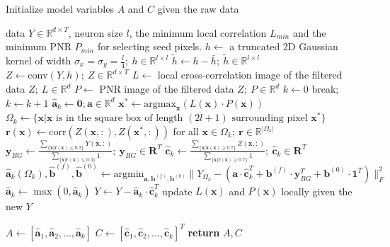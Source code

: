 \documentclass[9pt,lineno]{elife}
\begin{document}
\begin{algorithm}[t!]\small 
\caption{Initialize model variables $A$ and $C$ given the raw data}\label{algo:init}
\begin{algorithmic}[1]
\Require data $Y\in \mathbb{R}^{d\times T}$, neuron size $l$, the minimum local correlation $L_{min}$ and the minimum PNR  $P_{min}$ for selecting seed pixels. 
\State $h \leftarrow $ a truncated 2D Gaussian kernel of width $\sigma_x=\sigma_y=\frac{l}{4}; ~h\in \mathbb{R}^{l\times l}$ 
\State $\tilde{h} \leftarrow h - \bar{h}; ~\tilde{h}\in \mathbb{R}^{l\times l}$  
\State $Z \leftarrow \text{conv}(Y, h); ~ Z \in \mathbb{R}^{d\times T}$ 
\State $L \leftarrow $ local cross-correlation  image of the filtered data $Z; ~L\in \mathbb{R}^{d}$
\State $P \leftarrow $  PNR image of the filtered data $Z; ~P\in\mathbb{R}^{d}$
\State $k\leftarrow 0$ 
  \State break;
  \Else
  \State $k\leftarrow k+1$
    \State $\hat{\bm{a}}_k\leftarrow \bm{0}; \bm{a} \in\mathbb{R}^d$
  \State $\bm{x}^* \leftarrow \text{argmax}_{\bm{x}}(L(\bm{x})\cdot P(\bm{x}))$ 
  \State $\Omega_k \leftarrow \{\bm{x}|\bm{x} \text{ is in the square box of length }( 2 l+1) \text{ surrounding pixel } \bm{x}^*\}$ 
  \State $\bm{r}(\bm{x})\leftarrow \text{corr}(Z(\bm{x},:), Z(\bm{x}^*,:))$ for all $\bm{x}\in\Omega_k; ~ \bm{r}\in \mathbb{R}^{|\Omega_k|}$  
  \State $\bm{y}_{BG} \leftarrow \frac{\sum_{\{\bm{x}|\bm{r}(\bm{x})\leq 0.3\}}Y(\bm{x}, :)}{\sum_{\{\bm{x}|\bm{r}(\bm{x})\leq 0.3\}}1}; ~\bm{y}_{BG}\in\mathbf{R}^{T}$  
  \State $\hat{\bm{c}}_k \leftarrow \frac{\sum_{\{\bm{x}|\bm{x}(\bm{x})\geq 0.7\}}Z(\bm{x}, :)}{\sum_{\{\bm{x}|\bm{r}(\bm{x})\geq 0.7\}}1}; ~\hat{\bm{c}}_{k}\in\mathbf{R}^{T}$
  \State $\hat{\bm{a}}_{k}(\Omega_k), \hat{\bm{b}}^{(f)}, \hat{\bm{b}}^{(0)} \leftarrow \text{argmin}_{\bm{a}, \bm{b}^{(f)}, \bm{b}^{(0)}} \|Y_{\Omega_k} -(\bm{a}\cdot \hat{\bm{c}}_k^T+\bm{b}^{(f)}\cdot \bm{y}_{BG}^T+\bm{b}^{(0)}\cdot \bm{1}^T)\|^2_F$   %
  \State $\hat{\bm{a}}_k \leftarrow \max(0, \hat{\bm{a}}_k)$ 
  \State $Y\leftarrow Y - \hat{\bm{a}}_k\cdot \hat{\bm{c}}_k^T$ 
  \State update $L(\bm{x})$ and $P(\bm{x})$ locally given the new  $Y$  
    \EndIf

\EndWhile
\State $A\leftarrow [\hat{\bm{a}}_1, \hat{\bm{a}}_2, \hdots, \hat{\bm{a}}_k]$
\State $C\leftarrow [\hat{\bm{c}}_1, \hat{\bm{c}}_2, \hdots, \hat{\bm{c}}_k]^T$
\State \textbf{return} $A, C$
 \end{algorithmic} 
\end{algorithm}
\end{document}
